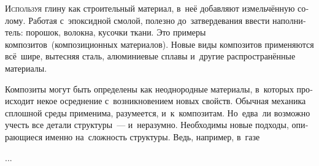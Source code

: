 

\thispagestyle{empty}

\label{chapter:composites}



\begin{otherlanguage}{russian}

\lettrine[lines=2, findent=2pt, nindent=0pt]{И}{спользуя} глину как строительный материал, в~неё добавляют измельчённую солому. Работая с~эпоксидной смолой, полезно до~затвердевания ввести наполнитель: порошок, волокна, кусочки ткани. Это примеры композитов~(композиционных материалов). Новые виды композитов применяются всё~шире, вытесняя сталь, алюминиевые сплавы и~другие распространённые материалы.

Композиты могут быть определены как неоднородные материалы, в~которых происходит некое осреднение с~возникновением новых свойств. Обычная механика сплошной среды применима, разумеется, и~к~композитам. Но~едва~ли возможно учесть все детали структуры~--- и~неразумно. Необходимы новые подходы, опирающиеся именно на~сложность структуры. Ведь, например, в~газе

...



\end{otherlanguage}



